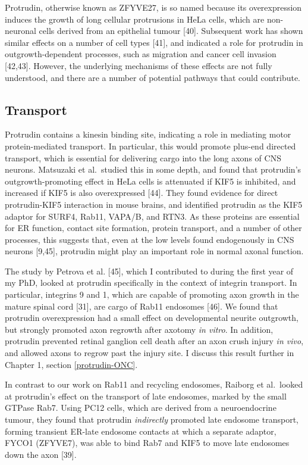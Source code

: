 \documentclass[
  12pt,
  a4paper,
]{book}
\begin{document}
Protrudin, otherwise known as ZFYVE27, is so named because its overexpression induces the growth of long cellular protrusions in HeLa cells, which are non-neuronal cells derived from an epithelial tumour {[}40{]}. Subsequent work has shown similar effects on a number of cell types {[}41{]}, and indicated a role for protrudin in outgrowth-dependent processes, such as migration and cancer cell invasion {[}42,43{]}. However, the underlying mechanisms of these effects are not fully understood, and there are a number of potential pathways that could contribute.

\hypertarget{intro-ptdn-transport}{%
\subsection{Transport}\label{intro-ptdn-transport}}

Protrudin contains a kinesin binding site, indicating a role in mediating motor protein-mediated transport. In particular, this would promote plus-end directed transport, which is essential for delivering cargo into the long axons of CNS neurons. Matsuzaki et al.~studied this in some depth, and found that protrudin's outgrowth-promoting effect in HeLa cells is attenuated if KIF5 is inhibited, and increased if KIF5 is also overexpressed {[}44{]}. They found evidence for direct protrudin-KIF5 interaction in mouse brains, and identified protrudin as the KIF5 adaptor for SURF4, Rab11, VAPA/B, and RTN3. As these proteins are essential for ER function, contact site formation, protein transport, and a number of other processes, this suggests that, even at the low levels found endogenously in CNS neurons {[}9,45{]}, protrudin might play an important role in normal axonal function.

The study by Petrova et al. {[}45{]}, which I contributed to during the first year of my PhD, looked at protrudin specifically in the context of integrin transport. In particular, integrins \textalpha{}9 and \textbeta{}1, which are capable of promoting axon growth in the mature spinal cord {[}31{]}, are cargo of Rab11 endosomes {[}46{]}. We found that protrudin overexpression had a small effect on developmental neurite outgrowth, but strongly promoted axon regrowth after axotomy \emph{in vitro}. In addition, protrudin prevented retinal ganglion cell death after an axon crush injury \emph{in vivo}, and allowed axons to regrow past the injury site. I discuss this result further in Chapter 1, section \ref{protrudin-ONC}.

In contrast to our work on Rab11 and recycling endosomes, Raiborg et al.~looked at protrudin's effect on the transport of late endosomes, marked by the small GTPase Rab7. Using PC12 cells, which are derived from a neuroendocrine tumour, they found that protrudin \emph{indirectly} promoted late endosome transport, forming transient ER-late endosome contacts at which a separate adaptor, FYCO1 (ZFYVE7), was able to bind Rab7 and KIF5 to move late endosomes down the axon {[}39{]}.
\end{document}
